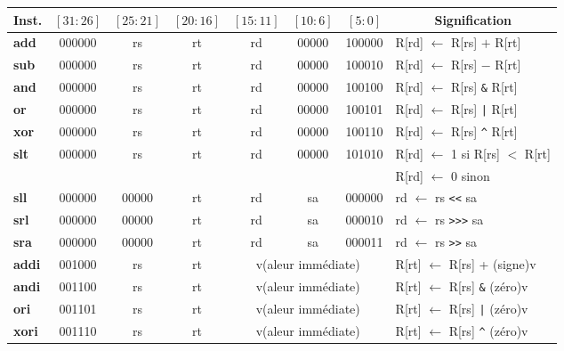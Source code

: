 \documentclass[12pt]{article}
\begin{document}
\begin{table}[!htpb]
\begin{center}
\begin{tabular}{|l|c|c|c|c|c|c|l|}
  \hline
  \multicolumn{1}{|c|}{Inst.} & $[31:26]$ & $[25:21]$ & $[20:16]$ & $[15:11]$ & $[10:6]$ & $[5:0]$ & \multicolumn{1}{|c|}{Signification}\\
  \hline
  \hline
  \textbf{add} & 000000 & rs & rt & rd & 00000 & 100000 & R[rd] $\leftarrow$ R[rs] $+$ R[rt]\\
  \hline
  \textbf{sub} & 000000 & rs & rt & rd & 00000 & 100010 & R[rd] $\leftarrow$ R[rs] $-$ R[rt]\\
  \hline
  \textbf{and} & 000000 & rs & rt & rd & 00000 & 100100 & R[rd] $\leftarrow$ R[rs] \verb+&+ R[rt]\\
  \hline
  \textbf{or} & 000000 & rs & rt & rd & 00000 & 100101 & R[rd] $\leftarrow$ R[rs] \verb+|+ R[rt]\\
  \hline
  \textbf{xor} & 000000 & rs & rt & rd & 00000 & 100110 & R[rd] $\leftarrow$ R[rs] \verb+^+ R[rt]\\
  \hline
  \multirow{2}{*}{\textbf{slt}} & \multirow{2}{*}{000000} & \multirow{2}{*}{rs} & \multirow{2}{*}{rt} & \multirow{2}{*}{rd}
  & \multirow{2}{*}{00000} & \multirow{2}{*}{101010} & R[rd] $\leftarrow$ 1 si R[rs] $<$ R[rt]\\
                                                   & & & & & & & R[rd] $\leftarrow$ 0 sinon\\
  \hline
  \textbf{sll} & 000000 & 00000 & rt & rd & sa & 000000 & rd $\leftarrow$ rs \verb+<<+ sa\\
  \hline
  \textbf{srl} & 000000 & 00000 & rt & rd & sa & 000010 & rd $\leftarrow$ rs \verb+>>>+ sa\\
  \hline
  \textbf{sra} & 000000 & 00000 & rt & rd & sa & 000011 & rd $\leftarrow$ rs \verb+>>+ sa\\
  \hline
  \textbf{addi} & 001000 & rs & rt & \multicolumn{3}{|c|}{v(aleur immédiate)} & R[rt] $\leftarrow$ R[rs] + (signe)v\\
  \hline
  \textbf{andi} & 001100 & rs & rt & \multicolumn{3}{|c|}{v(aleur immédiate)} & R[rt] $\leftarrow$ R[rs] \verb+&+ (zéro)v\\
  \hline
  \textbf{ori} & 001101 & rs & rt & \multicolumn{3}{|c|}{v(aleur immédiate)} & R[rt] $\leftarrow$ R[rs] \verb+|+ (zéro)v\\
  \hline
  \textbf{xori} & 001110 & rs & rt & \multicolumn{3}{|c|}{v(aleur immédiate)} & R[rt] $\leftarrow$ R[rs] \verb+^+ (zéro)v\\

\end{tabular}
\end{center}
\end{table}
\end{document}
